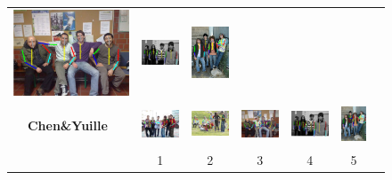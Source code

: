 \begin{figure}
\begin{tabular}{c c c c c c c}
    \includegraphics[height=0.145\linewidth]{imgidx_0129_sticks_waf.pdf}&
    \includegraphics[height=0.145\linewidth]{imgidx_0078_sticks_waf.pdf}&
    \includegraphics[height=0.145\linewidth]{imgidx_0139_sticks_waf.pdf}\\
    \begin{sideways}\bf \small Chen\&Yuille~\cite{Chen:2015:POC}\end{sideways}&
    \includegraphics[height=0.145\linewidth]{imgidx_0112_sticks_chen_waf.pdf}&
    \includegraphics[height=0.145\linewidth]{imgidx_0028_sticks_chen_waf.pdf}&
    \includegraphics[height=0.145\linewidth]{imgidx_0129_sticks_chen_waf.pdf}&
    \includegraphics[height=0.145\linewidth]{imgidx_0078_sticks_chen_waf.pdf}&
    \includegraphics[height=0.145\linewidth]{imgidx_0139_sticks_chen_waf.pdf}\\
    &1&2&3&4&5\\
  \end{tabular}


\end{figure}
